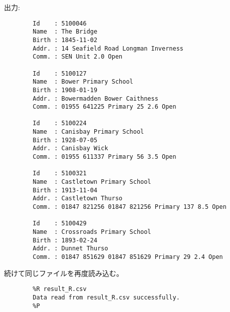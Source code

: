         出力:
        \begin{verbatim}
        Id    : 5100046
        Name  : The Bridge
        Birth : 1845-11-02
        Addr. : 14 Seafield Road Longman Inverness
        Comm. : SEN Unit 2.0 Open

        Id    : 5100127
        Name  : Bower Primary School
        Birth : 1908-01-19
        Addr. : Bowermadden Bower Caithness
        Comm. : 01955 641225 Primary 25 2.6 Open

        Id    : 5100224
        Name  : Canisbay Primary School
        Birth : 1928-07-05
        Addr. : Canisbay Wick
        Comm. : 01955 611337 Primary 56 3.5 Open

        Id    : 5100321
        Name  : Castletown Primary School
        Birth : 1913-11-04
        Addr. : Castletown Thurso
        Comm. : 01847 821256 01847 821256 Primary 137 8.5 Open

        Id    : 5100429
        Name  : Crossroads Primary School
        Birth : 1893-02-24
        Addr. : Dunnet Thurso
        Comm. : 01847 851629 01847 851629 Primary 29 2.4 Open
        \end{verbatim}

        続けて同じファイルを再度読み込む。
        \begin{verbatim}
        %R result_R.csv
        Data read from result_R.csv successfully.
        %P
        \end{verbatim}

